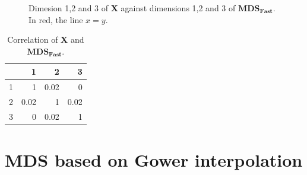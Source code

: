 \documentclass[11pt]{report}
\begin{document}
\begin{figure}[ht]
    \centering
    \caption{Dimesion 1,2 and 3 of \textbf{X} against dimensions 1,2 and 3 of  $\mathbf{MDS_{Fast}}$. \newline
            In red, the line $x=y$.}%
    \label{fast_example}%
\end{figure}


\begin{table}[ht]
\centering
\begin{tabular}{rrrr}
  \hline
 & 1 & 2 & 3 \\ 
  \hline
  1 & 1 & 0.02 & 0 \\ 
  2 & 0.02 & 1 & 0.02 \\ 
  3 & 0 & 0.02 & 1 \\ 
   \hline
\end{tabular}
\caption{Correlation of \textbf{X} and $\mathbf{MDS_{Fast}}$.} 
\label{corr_fast}
\end{table}

\section{MDS based on Gower interpolation}
\end{document}
